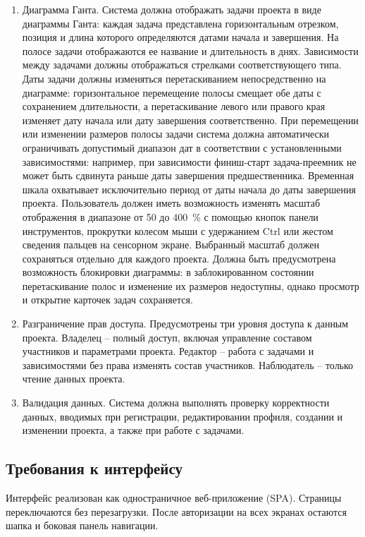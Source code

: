 \begin{enumerate}
    \item Диаграмма Ганта. Система должна отображать задачи проекта в виде диаграммы Ганта: каждая задача представлена горизонтальным отрезком, позиция и длина которого определяются датами начала и завершения. На полосе задачи отображаются ее название и длительность в днях. Зависимости между задачами должны отображаться стрелками соответствующего типа. Даты задачи должны изменяться перетаскиванием непосредственно на диаграмме: горизонтальное перемещение полосы смещает обе даты с сохранением длительности, а перетаскивание левого или правого края изменяет дату начала или дату завершения соответственно. При перемещении или изменении размеров полосы задачи система должна автоматически ограничивать допустимый диапазон дат в соответствии с установленными зависимостями: например, при зависимости финиш-старт задача-преемник не может быть сдвинута раньше даты завершения предшественника. Временная шкала охватывает исключительно период от даты начала до даты завершения проекта. Пользователь должен иметь возможность изменять масштаб отображения в диапазоне от 50 до 400~\% с помощью кнопок панели инструментов, прокрутки колесом мыши с удержанием Ctrl или жестом сведения пальцев на сенсорном экране. Выбранный масштаб должен сохраняться отдельно для каждого проекта. Должна быть предусмотрена возможность блокировки диаграммы: в заблокированном состоянии перетаскивание полос и изменение их размеров недоступны, однако просмотр и открытие карточек задач сохраняется.

    \item Разграничение прав доступа. Предусмотрены три уровня доступа к данным проекта. Владелец -- полный доступ, включая управление составом участников и параметрами проекта. Редактор -- работа с задачами и зависимостями без права изменять состав участников. Наблюдатель -- только чтение данных проекта.

    \item Валидация данных. Система должна выполнять проверку корректности данных, вводимых при регистрации, редактировании профиля, создании и изменении проекта, а также при работе с задачами.
\end{enumerate}

\subsection{Требования к интерфейсу}

Интерфейс реализован как одностраничное веб-приложение (SPA). Страницы переключаются без перезагрузки. После авторизации на всех экранах остаются шапка и боковая панель навигации.

